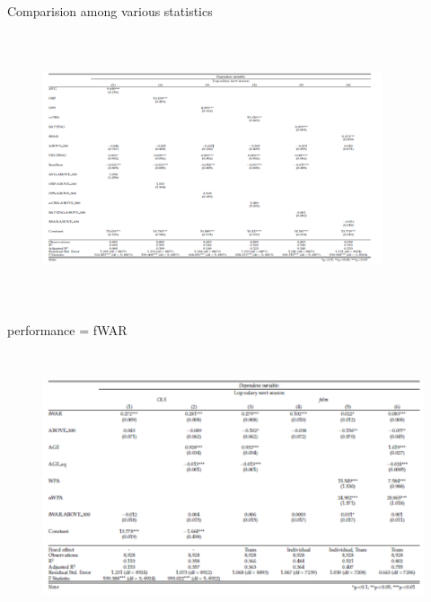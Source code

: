 \documentclass[dvipdfmx,12pt]{beamer}
\begin{document}
\begin{frame}
  \scriptsize
  Comparision among various statistics

 \begin{figure}
   \includegraphics[width = 10cm, height = 8cm]{fig_tab/mt_tab1.pdf}
\label{}
 \end{figure}
\end{frame}

\begin{frame}
  \scriptsize
  performance = fWAR

  \begin{figure}
    \includegraphics[width = 12cm, height = 8cm]{fig_tab/mt_tab2_0.pdf}
\label{}
  \end{figure}
\end{frame}
\end{document}
